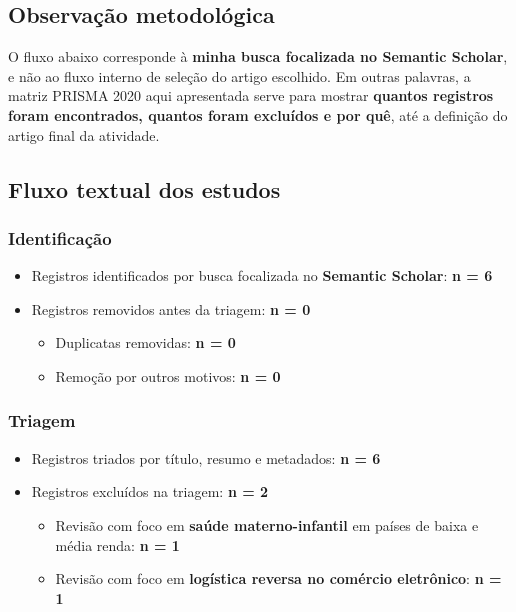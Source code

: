 \documentclass[12pt]{article}
\begin{document}
\subsection{Observação metodológica}
\label{sec:orgfac8bfc}

O fluxo abaixo corresponde à \textbf{minha busca focalizada no Semantic Scholar}, e não ao fluxo interno de seleção do artigo escolhido. Em outras palavras, a matriz PRISMA 2020 aqui apresentada serve para mostrar \textbf{quantos registros foram encontrados, quantos foram excluídos e por quê}, até a definição do artigo final da atividade.

\subsection{Fluxo textual dos estudos}
\label{sec:org33553ec}

\subsubsection{Identificação}
\label{sec:orgdb57fb8}
\begin{itemize}
\item Registros identificados por busca focalizada no \textbf{Semantic Scholar}: \textbf{n = 6}
\item Registros removidos antes da triagem: \textbf{n = 0}
\begin{itemize}
\item Duplicatas removidas: \textbf{n = 0}
\item Remoção por outros motivos: \textbf{n = 0}
\end{itemize}
\end{itemize}

\subsubsection{Triagem}
\label{sec:org0382415}
\begin{itemize}
\item Registros triados por título, resumo e metadados: \textbf{n = 6}
\item Registros excluídos na triagem: \textbf{n = 2}
\begin{itemize}
\item Revisão com foco em \textbf{saúde materno-infantil} em países de baixa e média renda: \textbf{n = 1}
\item Revisão com foco em \textbf{logística reversa no comércio eletrônico}: \textbf{n = 1}
\end{itemize}
\end{itemize}
\end{document}
